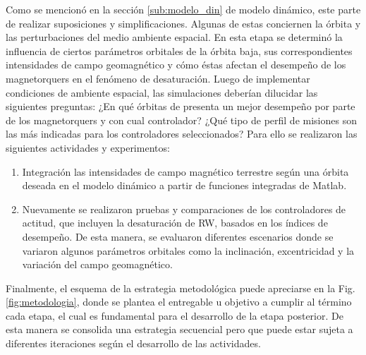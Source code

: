 Como se mencionó en la sección \ref{sub:modelo_din} de modelo dinámico, este parte de realizar suposiciones y simplificaciones. Algunas de estas conciernen la órbita y las perturbaciones del medio ambiente espacial. En esta etapa se determinó la influencia de ciertos parámetros orbitales de la órbita baja, sus correspondientes intensidades de campo geomagnético y cómo éstas afectan el desempeño de los magnetorquers en el fenómeno de desaturación.  
Luego de implementar condiciones de ambiente espacial, las simulaciones deberían dilucidar las siguientes preguntas: ¿En qué órbitas de presenta un mejor desempeño por parte de los magnetorquers y con cual controlador? ¿Qué tipo de perfil de misiones son las más indicadas para los controladores seleccionados? Para ello se realizaron las siguientes actividades y experimentos:
\begin{enumerate}[label=\alph*)]
	
	\item	Integración las intensidades de campo magnético terrestre según una órbita deseada en el modelo dinámico a partir de funciones integradas de Matlab. 
	\item	Nuevamente se realizaron pruebas y comparaciones de los controladores de actitud, que incluyen la desaturación de RW, basados en los índices de desempeño. De esta manera, se evaluaron diferentes escenarios donde se variaron algunos parámetros orbitales como la inclinación, excentricidad y la variación del campo geomagnético.	
	
\end{enumerate}

Finalmente, el esquema de la estrategia metodológica puede apreciarse en la Fig.\ref{fig:metodologia}, donde se plantea el entregable u objetivo a cumplir al término cada etapa, el cual es fundamental para el desarrollo de la etapa posterior. De esta manera se consolida una estrategia secuencial pero que puede estar sujeta a diferentes iteraciones según el desarrollo de las actividades.

